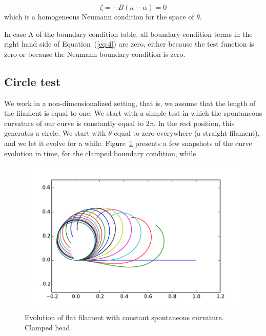 \[\zeta = -B(\kappa-\alpha) = 0\]
%
which is a homogeneous Neumann condition for the space of $\theta$. 

In case A of the boundary condition table, all boundary condition
terms in the right hand side of Equation~(\ref{eq:4}) are zero, either
because the test function is zero or because the Neumann boundary
condition is zero. 

\subsection{Circle test}\label{circle-test}

We work in a non-dimensionalized setting, that is, we assume that the
length of the filament is equal to one. We start with a simple test in
which the spontaneous curvature of our curve is constantly equal to
$2\pi$. In the rest position, this generates a circle. We start with
$\theta$ equal to zero everywhere (a straight filament), and we let it
evolve for a while. Figure~\ref{fig:circle-clamped} presents a few
snapshots of the curve evolution in time, for the clamped boundary
condition, while

\begin{figure}
  \centering
  \includegraphics[width=\textwidth]{circle_clamped}
  \caption{Evolution of flat filament with constant spontaneous
    curvature. Clamped head.}
  \label{fig:circle-clamped}
\end{figure}

